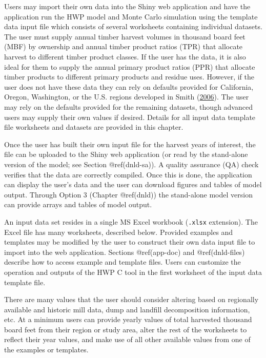 \documentclass[
  openany]{book}
\begin{document}
Users may import their own data into the Shiny web application and have
the application run the HWP model and Monte Carlo simulation using the
template data input file which consists of several worksheets containing
individual datasets. The user must supply annual timber harvest volumes
in thousand board feet (MBF) by ownership and annual timber product
ratios (TPR) that allocate harvest to different timber product classes.
If the user has the data, it is also ideal for them to supply the annual
primary product ratios (PPR) that allocate timber products to different
primary products and residue uses. However, if the user does not have
these data they can rely on defaults provided for California, Oregon,
Washington, or the U.S. regions developed in Smith
(\protect\hyperlink{ref-smith2006}{2006}). The user may rely on the
defaults provided for the remaining datasets, though advanced users may
supply their own values if desired. Details for all input data template
file worksheets and datasets are provided in this chapter.

Once the user has built their own input file for the harvest years of
interest, the file can be uploaded to the Shiny web application (or read
by the stand-alone version of the model; see Section @ref(dnld-sa)). A
quality assurance (QA) check verifies that the data are correctly
compiled. Once this is done, the application can display the user's data
and the user can download figures and tables of model output. Through
Option 3 (Chapter @ref(dnld)) the stand-alone model version can provide
arrays and tables of model output.

An input data set resides in a single MS Excel workbook (\texttt{.xlsx}
extension). The Excel file has many worksheets, described below.
Provided examples and templates may be modified by the user to construct
their own data input file to import into the web application. Sections
@ref(app-doc) and @ref(dnld-files) describe how to access example and
template files. Users can customize the operation and outputs of the HWP
C tool in the first worksheet of the input data template file.

There are many values that the user should consider altering based on
regionally available and historic mill data, dump and landfill
decomposition information, etc. At a minimum users can provide yearly
values of total harvested thousand board feet from their region or study
area, alter the rest of the worksheets to reflect their year values, and
make use of all other available values from one of the examples or
templates.
\end{document}
